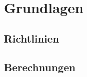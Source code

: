 \section{Grundlagen}\label{sec:Grundlagen}


\subsection{Richtlinien}\label{subsec:Richtlinien}



\subsection{Berechnungen}\label{subsec:Berechnungen}

